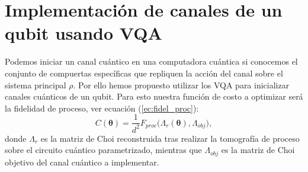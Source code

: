 \documentclass[letterpaper,12pt]{thesisECFM}
\theoremstyle{plain}
\theoremstyle{definition}
\theoremstyle{definition}
\theoremstyle{remark}
\newcommand{\1}{\mathbb{1}}
\begin{document}
\section{Implementación de canales de un qubit usando VQA}\label{sec:impl_vqa}  %
Podemos iniciar un canal cuántico en una computadora cuántica si conocemos el conjunto de compuertas específicas que repliquen la acción del canal sobre el sistema principal $\rho$. Por ello hemos propuesto utilizar los VQA para inicializar canales cuánticos de un qubit. Para esto nuestra función de costo a optimizar será la fidelidad de proceso, ver ecuación (\ref{ec:fidel_proc}):
\begin{equation}
    \label{ec:cost_func}
    C(\bm{\theta}) = \frac{1}{d^2} F_{proc}\bigl(\Lambda_r(\bm{\theta}), \Lambda_{obj} \bigr),
\end{equation}
 donde $\Lambda_r$ es la matriz de Choi reconstruida tras realizar la
tomografía de proceso sobre el circuito cuántico parametrizado, mientras que
$\Lambda_{obj}$ es la matriz de Choi objetivo del canal cuántico a implementar.
 
\end{document}

